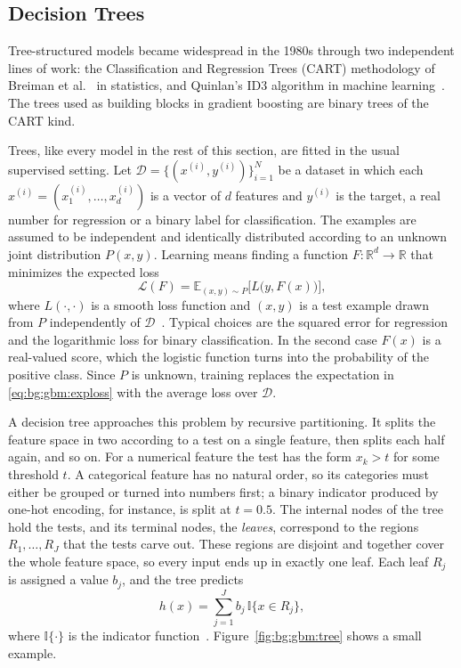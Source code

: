     \subsection{Decision Trees}
    \label{subsec:bg:gbm:trees}
    Tree-structured models became widespread
    in the 1980s through two independent lines of work: the Classification and
    Regression Trees (CART) methodology of Breiman et al.~\cite{breiman1984} in
    statistics, and Quinlan's ID3 algorithm in machine learning~\cite{quinlan1986}.
    The trees used as building blocks in gradient boosting are binary trees of the
    CART kind.
    
    Trees, like every model in the rest of this section, are fitted in the usual
    supervised setting. Let
    $\mathcal{D} = \{(x^{(i)}, y^{(i)})\}_{i=1}^{N}$ be a dataset in which each
    $x^{(i)} = (x^{(i)}_1, \dots, x^{(i)}_d)$ is a vector of $d$ features and
    $y^{(i)}$ is the target, a real number for regression or a binary label for
    classification. The examples are assumed to be independent and identically
    distributed according to an unknown joint distribution $P(x, y)$. Learning
    means finding a function $F \colon \mathbb{R}^d \to \mathbb{R}$ that minimizes
    the expected loss
    \begin{equation}
    \mathcal{L}(F) = \mathbb{E}_{(x, y) \sim P}\bigl[ L\bigl(y, F(x)\bigr) \bigr],
    \label{eq:bg:gbm:exploss}
    \end{equation}
    where $L(\cdot, \cdot)$ is a smooth loss function and $(x, y)$ is a test
    example drawn from $P$ independently of $\mathcal{D}$~\cite{prokhorenkova2018}.
    Typical choices are the squared error for regression and the logarithmic loss
    for binary classification. In the second case $F(x)$ is a real-valued score,
    which the logistic function turns into the probability of the positive class.
    Since $P$ is unknown, training replaces the expectation in
    \eqref{eq:bg:gbm:exploss} with the average loss over $\mathcal{D}$.
    
    A decision tree approaches this problem by recursive partitioning. It splits
    the feature space in two according to a test on a single feature, then splits
    each half again, and so on. For a numerical feature the test has the form
    $x_k > t$ for some threshold $t$. A categorical feature has no natural order,
    so its categories must either be grouped or turned into numbers first; a
    binary indicator produced by one-hot encoding, for instance, is split at
    $t = 0.5$. The internal nodes of the tree hold the
    tests, and its terminal nodes, the \emph{leaves}, correspond to the regions
    $R_1, \dots, R_J$ that the tests carve out. These regions are disjoint and
    together cover the whole feature space, so every input ends up in exactly one
    leaf. Each leaf $R_j$ is assigned a value $b_j$, and the tree predicts
    \begin{equation}
    h(x) = \sum_{j=1}^{J} b_j \, \mathbb{I}{\{x \in R_j\}},
    \label{eq:bg:gbm:tree}
    \end{equation}
    where $\mathbb{I}\{\cdot\}$ is the indicator function~\cite{friedman2001}.
    Figure~\ref{fig:bg:gbm:tree} shows a small example.
    
